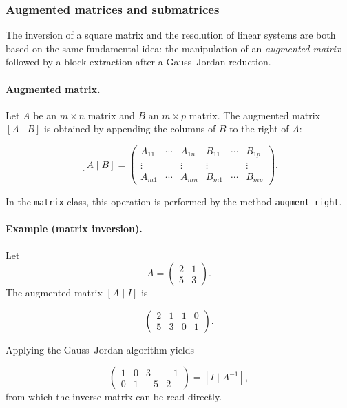 \subsubsection{Augmented matrices and submatrices}
\label{ssub:matrix-augmentation-submatrix}

The inversion of a square matrix and the resolution of linear systems are both
based on the same fundamental idea: the manipulation of an \emph{augmented matrix}
followed by a block extraction after a Gauss--Jordan reduction.

\medskip

\paragraph{Augmented matrix.}
Let $A$ be an $m\times n$ matrix and $B$ an $m\times p$ matrix.
The augmented matrix $[A \mid B]$ is obtained by appending the columns of $B$
to the right of $A$:

\[
[A \mid B] =
\begin{pmatrix}
A_{11} & \cdots & A_{1n} & B_{11} & \cdots & B_{1p} \\
\vdots &        & \vdots & \vdots &        & \vdots \\
A_{m1} & \cdots & A_{mn} & B_{m1} & \cdots & B_{mp}
\end{pmatrix}.
\]

In the \texttt{matrix} class, this operation is performed by the method
\texttt{augment\_right}.

\medskip

\paragraph{Example (matrix inversion).}
Let
\[
A =
\begin{pmatrix}
2 & 1\\
5 & 3
\end{pmatrix}.
\]
The augmented matrix $[A \mid I]$ is

\[
\begin{pmatrix}
2 & 1 & 1 & 0\\
5 & 3 & 0 & 1
\end{pmatrix}.
\]

Applying the Gauss--Jordan algorithm yields

\[
\begin{pmatrix}
1 & 0 & 3 & -1\\
0 & 1 & -5 & 2
\end{pmatrix}
=
[I \mid A^{-1}],
\]
from which the inverse matrix can be read directly.

